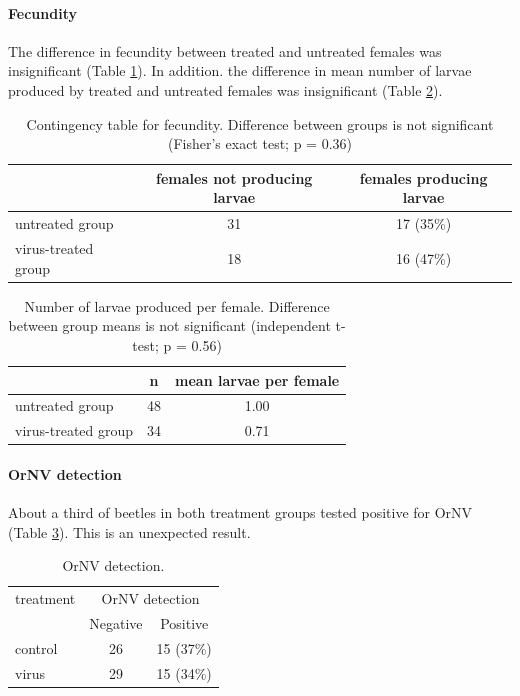 \documentclass[12pt,letterpaper,english,bibliography=totocnumbered, abstract=on]{scrartcl}
\begin{document}
\paragraph{Fecundity} The difference in fecundity between treated and untreated females was insignificant (Table \ref{fecundity contingency table}). In addition. the difference in mean number of larvae produced by treated and untreated females was insignificant (Table \ref{larvae per female}).
\begin{table}[H]
	\centering
	\caption{Contingency table for fecundity. Difference between groups is not significant (Fisher's exact test; p = 0.36)}
	\label{fecundity contingency table}
	\begin{tabular}{lcc}
		\hline
		& females not producing larvae & females producing larvae \\
		\hline
		untreated group & 31 & 17 (35\%) \\
		virus-treated group & 18 & 16 (47\%)\\
		\hline
	\end{tabular}
\end{table}
\begin{table}[H]
	\centering
	\caption{Number of larvae produced per female. Difference between group means is not significant (independent t-test; p = 0.56)}
	\label{larvae per female}
	\begin{tabular}{lcc}
		\hline
		& n & mean larvae per female \\
		\hline
		untreated group & 48 & 1.00 \\
		virus-treated group & 34 & 0.71 \\
		\hline
	\end{tabular}
\end{table}

\paragraph{OrNV detection} About a third of beetles in both treatment groups tested positive for OrNV (Table \ref{ornv detection}). This is an unexpected result.

\begin{table}[H]
	\centering
	\caption{OrNV detection.}
	\label{ornv detection}
	\begin{tabular}{lcc}
		\hline
		treatment & \multicolumn{2}{c}{OrNV detection} \\ \cline{2-3}
		          & Negative & Positive \\
		\hline
		control   & 26 & 15 (37\%)\\
		virus     & 29 & 15 (34\%)\\
		\hline
	\end{tabular}
\end{table}
\end{document}
